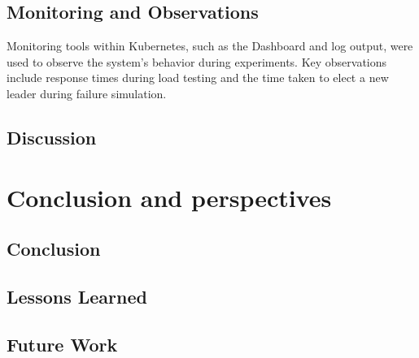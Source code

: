 \documentclass{article}
\begin{document}
  \subsection{Monitoring and Observations}
    Monitoring tools within Kubernetes, such as the Dashboard and log output, were used to observe the system's behavior during experiments. Key observations include response times during load testing and the time taken to elect a new leader during failure simulation.


  \subsection{Discussion}

\section{Conclusion and perspectives}
    \subsection{Conclusion}
    
    \subsection{Lessons Learned}

    \subsection{Future Work}

\newpage
    \nocite{*}
\end{document}
